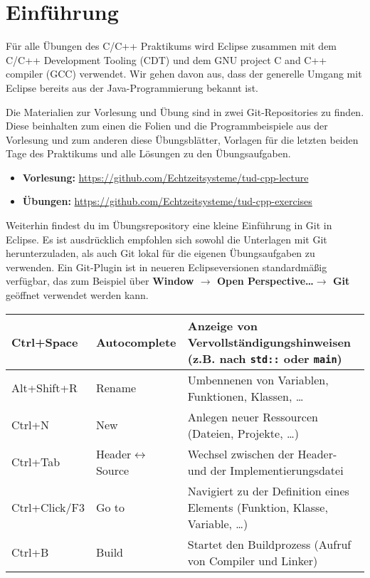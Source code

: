 
\newcommand{\exday}{1}
\cppSetTitle
\setcounter{section}{-1}



\cppSetHeaderAndMakeTitle

\section*{Einführung}
Für alle Übungen des C/C++ Praktikums wird Eclipse zusammen mit dem C/C++ Development Tooling (CDT) und dem  GNU project C and C++ compiler (GCC) verwendet.
Wir gehen davon aus, dass der generelle Umgang mit Eclipse bereits aus der Java-Programmierung bekannt ist.

Die Materialien zur Vorlesung und Übung sind in zwei Git-Repositories zu finden.
Diese beinhalten zum einen die Folien und die Programmbeispiele aus der Vorlesung und zum anderen diese Übungsblätter, Vorlagen für die letzten beiden Tage des Praktikums und alle Lösungen zu den Übungsaufgaben.

\begin{itemize}
	\item \textbf{Vorlesung:} \url{https://github.com/Echtzeitsysteme/tud-cpp-lecture}
	\item \textbf{Übungen:} \url{https://github.com/Echtzeitsysteme/tud-cpp-exercises}
\end{itemize}

Weiterhin findest du im Übungsrepository eine kleine Einführung in Git in Eclipse.
Es ist ausdrücklich empfohlen sich sowohl die Unterlagen mit Git herunterzuladen, als auch Git lokal für die eigenen Übungsaufgaben zu verwenden.
Ein Git-Plugin ist in neueren Eclipseversionen standardmäßig verfügbar, das zum Beispiel über \textbf{Window $\rightarrow$ Open Perspective\dots $\rightarrow$ Git} geöffnet verwendet werden kann.


\begin{tabular}{l|l|p{11.5cm}}
	Ctrl+Space & Autocomplete &
	Anzeige von Vervollständigungshinweisen (z.B. nach \texttt{std::} oder \texttt{main})
	\\\hline
	Alt+Shift+R & Rename &
	Umbennenen von Variablen, Funktionen, Klassen, \dots
	\\\hline
	Ctrl+N & New &
	Anlegen neuer Ressourcen (Dateien, Projekte, \dots)
	\\\hline
	Ctrl+Tab & Header$\leftrightarrow$Source &
	Wechsel zwischen der Header- und der Implementierungsdatei
	\\\hline
	Ctrl+Click/F3 & Go to &
	Navigiert zu der Definition eines Elements (Funktion, Klasse, Variable, \dots)
	\\\hline
	Ctrl+B & Build &
	Startet den Buildprozess (Aufruf von Compiler und Linker)
\end{tabular}


\newpage

\newpage

\newpage

\newpage



